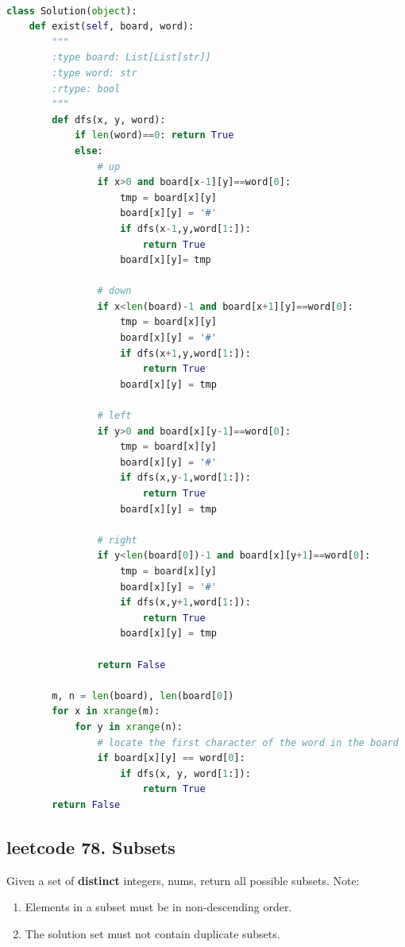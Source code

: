 \documentclass[a4paper,10pt]{article}
\begin{document}
\begin{lstlisting}[language=Python, caption=Problem79. Word Search]

class Solution(object):
    def exist(self, board, word):
        """
        :type board: List[List[str]]
        :type word: str
        :rtype: bool
        """
        def dfs(x, y, word):
            if len(word)==0: return True
            else:
                # up
                if x>0 and board[x-1][y]==word[0]:
                    tmp = board[x][y]
                    board[x][y] = '#'
                    if dfs(x-1,y,word[1:]):
                        return True
                    board[x][y]= tmp
                
                # down
                if x<len(board)-1 and board[x+1][y]==word[0]:
                    tmp = board[x][y]
                    board[x][y] = '#'
                    if dfs(x+1,y,word[1:]):
                        return True
                    board[x][y] = tmp
                
                # left
                if y>0 and board[x][y-1]==word[0]:
                    tmp = board[x][y]
                    board[x][y] = '#'
                    if dfs(x,y-1,word[1:]):
                        return True
                    board[x][y] = tmp
                
                # right
                if y<len(board[0])-1 and board[x][y+1]==word[0]:
                    tmp = board[x][y]
                    board[x][y] = '#'
                    if dfs(x,y+1,word[1:]):
                        return True
                    board[x][y] = tmp
                
                return False

        m, n = len(board), len(board[0])
        for x in xrange(m):
            for y in xrange(n):
                # locate the first character of the word in the board
                if board[x][y] == word[0]:
                    if dfs(x, y, word[1:]):
                        return True
        return False
\end{lstlisting}


\subsection{leetcode 78. Subsets}
Given a set of \textbf{distinct} integers, nums, return all possible subsets. Note:
\begin{enumerate}
    \item Elements in a subset must be in non-descending order.
    \item The solution set must not contain duplicate subsets.
\end{enumerate}
\end{document}
